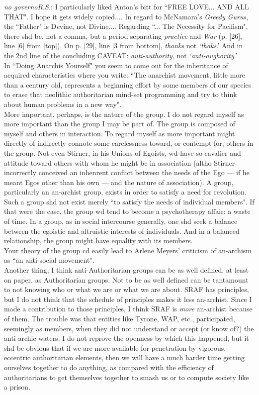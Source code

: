 \documentclass[12pt, onecolumn, letterpaper, oneside]{book}
\begin{document}
\noindent \emph{no governoR.S.}:
\indent I particularly liked Anton's bitt for ``FREE LOVE... AND ALL THAT". I hope it gets widely copied.... In regard to McNamara's \emph{Greedy Gurus}, the ``Father" is D\emph{e}vine, not Divine.... Regarding ``... The Necessity for Pacifism", there shd be, not a comma, but a period separating \emph{practice} and \emph{War} (p. [26], line [6] from [top]). On p. [29], line [3 from bottom], \emph{thanks} not \emph{`thaks}.' And in the 2nd line of the concluding CAVEAT: \emph{auti-authority}, not \emph{`anti-aughority'}\\
In ``Doing Anarchis Yourself" you seem to come out for the inheritance of acquired characteristics where you write: ``The anarchist movement, little more than a century old, represents a beginning effort by some members of our species to erase that neolithic authoritarian mind-set programming and try to think about human problems in a new way".\\
More important, perhaps, is the nature of the group. I do not regard myself as more important than the group I may be part of. The group is composed of myself and others in interaction. To regard myself as more important might directly of indirectly connote some carelessness toward, or contempt for, others in the group. Not even Stirner, in his Unions of Egoists, wd have so cavalier and attitude toward others with whom he might be in association (altho Stirner incorrectly conceived an inhenrent conflict between the needs of the Ego --- if he meant Egos other than his own --- and the nature of association). A group, particularly an an-archist group, exists in order to satisfy a need for revolution. Such a group shd not exist merely ``to satisfy the needs of individual members". If that were the case, the group wd tend to become a psychotherapy affair: a waste of time. In a group, as in social intercourse generally, one shd seek a balance between the egoistic and altruistic interests of individuals. And in a balanced relationship, the group might have equality with its members.\\
Your theory of the group cd easily lead to Arlene Meyers' criticism of an-archism as ``an anti-social movement".\\
Another thing; I think anti-Authoritarian groups can be as well defined, at least on paper, as Authoritarian groups. Not to be as well defined can be tantamount to not knowing who or what we are or what we are about. SRAF has principles, but I do not think that the schedule of principles makes it less an-archist. Since I made a contribution to those principles, I think SRAF is \emph{more} an-archist because of them. The trouble was that entities like Tyrone, WAP, etc., participated, seemingly as members, when they did not understand or accept (or know of?) the anti-archic waters. I do not reprove the openness by which this happened, but it shd be obvious that if we are more available for penetration by vigorous, eccentric authoritarian elements, then we will have a much harder time getting ourselves together to do anything, as compared with the efficiency of authoritarians to get themselves together to smash us or to compute society like a prison.\\
\end{document}
